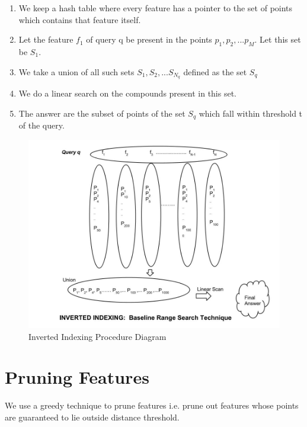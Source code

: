 \begin{enumerate}
	\item We keep a hash table where every feature has a pointer to the set of points which contains that feature itself.
	\item Let the feature $f_1$ of query q be present in the points $p_1,p_2,...p_M$. Let this set be $S_1$.
	\item We take a union of all such sets $S_1, S_2,...S_{N_q}$ defined as the set $S_q$
	\item We do a linear search on the compounds present in this set.
	\item The answer are the subset of points of the set $S_q$ which fall within threshold t of the query.	 
\end{enumerate}


\begin{figure}[ht]	
\centering
\includegraphics[width=1 \columnwidth]{img/image0c.jpg}
\caption{Inverted Indexing Procedure Diagram}
\label{fig: invert}
\end{figure}




\section{Pruning Features}
 We use a greedy technique to prune features i.e. prune out features whose points are guaranteed to lie outside distance threshold.
 
